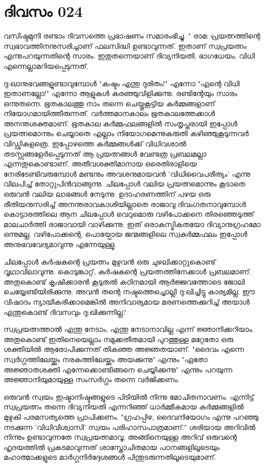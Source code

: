 \newpage
\section{ദിവസം 024}


വസിഷ്ഠമുനി രണ്ടാം ദിവസത്തെ പ്രഭാഷണം സമാരംഭിച്ചു. " രാമ: പ്രയത്നത്തിന്റെ സ്വഭാവത്തിനനുസരിച്ചാണ്‌ ഫലസിദ്ധി ഉണ്ടാവുന്നത്‌. ഇതാണ്‌ സ്വപ്രയത്നം എന്നുപറയുന്നതിന്റെ സാരം. ഇതുതന്നെയാണ്‌ ദിവ്യനിയതി, ഭാഗധേയം, വിധി എന്നെല്ലാമറിയപ്പെടുന്നത്‌.

ദു:ഖാനുഭവങ്ങളുണ്ടാവുമ്പോള്‍ "കഷ്ടം എന്തു ദുരിതം!" എന്നോ "എന്റെ വിധി ഇതാണല്ലോ!" എന്നോ ആളുകള്‍ കരഞ്ഞുവിളിക്കുന്നു. രണ്ടിന്റേയും സാരം ഒന്നുതന്നെ. ഭൂതകാലത്തു നാം തന്നെ ചെയ്തുകൂട്ടിയ കര്‍മ്മങ്ങളാണ്‌ നിയോഗമായിത്തീരുന്നത്‌. വര്‍ത്തമാനകാലം ഭൂതകാലത്തേക്കാള്‍ അനന്തശക്തമാണ്‌. ഭൂതകാല കര്‍മ്മഫലങ്ങളില്‍ സംതൃപ്തരായി ഇപ്പോള്‍ പ്രയത്നമൊന്നും ചെയ്യാതെ എല്ലാം നിയോഗമെന്നുകരുതി കഴിഞ്ഞുകൂടുന്നവര്‍ വിഡ്ഢികളത്രെ. ഇപ്പോഴത്തെ കര്‍മ്മങ്ങള്‍ക്ക്‌ വിധിവശാല്‍ തടസ്സങ്ങളേര്‍പ്പെടുന്നത്‌ ആ പ്രയത്നങ്ങള്‍ വേണ്ടത്ര പ്രബലമല്ലാ എന്നതുകൊണ്ടാണ്‌. അതീവശക്തിമാനായ ഒരെതിരാളിയെ നേരിടേണ്ടിവരുമ്പോള്‍ മണ്ടനും അവശനുമായവന്‍ 'വിധിവൈപരീത്യം' എന്നു വിലപിച്ച്‌ തോറ്റുപിന്‍വാങ്ങുന്നു. ചിലപ്പോള്‍ വലിയ പ്രയത്നമൊന്നും കൂടാതെ ഒരുവന്‍ വലിയ ലാഭങ്ങള്‍ നേടുന്നു. ഉദാഹരണത്തിന്‌ പഴയ ഒരു രീതിയനുസരിച്ച്‌ അനന്തരാവകാശിയില്ലാതെ രാജാവു ദിവംഗതനാവുമ്പോള്‍ കൊട്ടാരത്തിലെ ആന ചിലപ്പോള്‍ വെറുമൊരു വഴിപോക്കനെ തിരഞ്ഞെടുത്ത്‌ മാലചാര്‍ത്തി രാജാവായി വാഴിക്കുന്നു. ഇത്‌ ഒരാകസ്മികതയോ ദിവ്യാനുഗ്രഹമോ ഒന്നുമല്ല. വഴിപോക്കന്റെ, പൊയ്പോയ ജന്മങ്ങളിലെ സ്വകര്‍മ്മഫലം ഇപ്പോള്‍ അനുഭവവേദ്യമാവുന്നു എന്നേയുള്ളു. 

ചിലപ്പോള്‍ കര്‍ഷകന്റെ പ്രയത്നം മുഴുവന്‍ ഒരു ചുഴലിക്കാറ്റുകൊണ്ട്‌ വൃഥാവിലാവുന്നു. കൊടുങ്കാറ്റ്‌, കര്‍ഷകന്റെ പ്രയത്നത്തിനേക്കാള്‍ പ്രബലമാണ്‌. അതുകൊണ്ട്‌ കൃഷിക്കാരന്‍ കൂടുതല്‍ കഠിനമായി ആര്‍ജ്ജവത്തോടെ ജോലി ചെയ്യേണ്ടിയിരിക്കുന്നു. അവന്‍ തന്റെ നഷ്ടത്തെച്ചൊല്ലി ദു:ഖിച്ചിട്ടു കാര്യമില്ല. ഈ വിഷാദം ന്യായീകരിക്കാമെങ്കില്‍ അനിവാര്യമായ മരണത്തെക്കുറിച്ച്‌ അയാള്‍ എന്തുകൊണ്ട്‌ ദിവസവും ദു:ഖിക്കുന്നില്ല?

സ്വപ്രയത്നത്താല്‍ എന്തു നേടാം, എന്തു നേടാനാവില്ല എന്ന് ജ്ഞാനിക്കറിയാം. അതുകൊണ്ട്‌ ഇതിനെയെല്ലാം നമുക്കതീതമായി പുറത്തുള്ള മറ്റേതോ ഒരു ശക്തിയില്‍ ആരോപിക്കുന്നത്‌ തികഞ്ഞ അജ്ഞതയാണ്‌. "ദൈവം എന്നെ സ്വര്‍ഗ്ഗത്തിലേയ്ക്കും നരകത്തിലേയ്ക്കും അയക്കുന്നു" എന്നും "ഏതോ അജ്ഞാതശക്തി എന്നേക്കൊണ്ടിങ്ങനെ ചെയ്യിക്കുന്നു" എന്നും പറയുന്ന അജ്ഞാനിയുമായുള്ള സംസര്‍ഗ്ഗം തന്നെ വര്‍ജിക്കണം.

ഒരുവന്‍ സ്വയം ഇഷ്ടാനിഷ്ടങ്ങളുടെ പിടിയില്‍ നിന്നു മോചിതനാവണം. എന്നിട്ട്‌ സ്വപ്രയത്നം തന്നെ ദിവ്യനിയതി എന്നറിഞ്ഞ്‌ ധാര്‍മ്മീകമായ കര്‍മ്മങ്ങളില്‍ മുഴുകി പരമസത്യത്തെ പ്രാപിക്കണം. "ഗ്രഹപ്പിഴ, ദൈവനിയോഗം എന്നു പറഞ്ഞു നടക്കുന്ന 'വിധിവിശ്വാസി' സ്വയം പരിഹാസപാത്രമാണ്‌." ശരിയായ അറിവില്‍ നിന്നും ഉണ്ടാവുന്നതേ സ്വപ്രയത്നമാവൂ. അങ്ങിനെയുള്ള അറിവ്‌ ഒരുവന്റെ ഹൃദയത്തില്‍ പ്രകടമാവുന്നത്‌ ശാസ്ത്രോചിതമായ പഠനങ്ങളിലൂടെയും മഹാത്മാക്കളുടെ മാര്‍ഗ്ഗനിര്‍ദ്ദേശങ്ങള്‍ പിന്തുടരുന്നതിലൂടെയുമാണ്‌.
